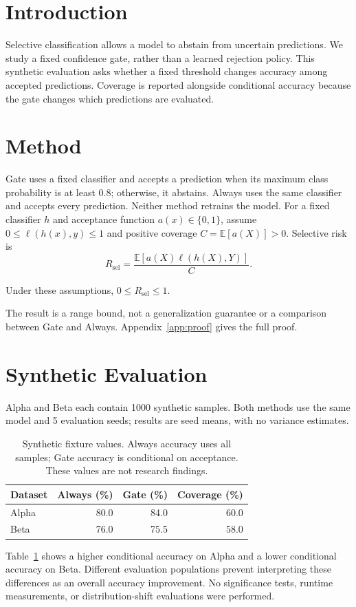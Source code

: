 \section{Introduction}
Selective classification allows a model to abstain from uncertain predictions.
We study a fixed confidence gate, rather than a learned rejection policy.
This synthetic evaluation asks whether a fixed threshold changes accuracy among
accepted predictions. Coverage is reported alongside conditional accuracy because
the gate changes which predictions are evaluated.
\section{Method}\label{sec:method}
Gate uses a fixed classifier and accepts a prediction when its maximum class
probability is at least 0.8; otherwise, it abstains. Always uses the same classifier
and accepts every prediction. Neither method retrains the model.
For a fixed classifier $h$ and acceptance function $a(x)\in\{0,1\}$, assume
$0\leq\ell(h(x),y)\leq1$ and positive coverage $C=\mathbb{E}[a(X)]>0$.
Selective risk is
\begin{equation}\label{eq:risk}
R_{\mathrm{sel}}=\frac{\mathbb{E}[a(X)\ell(h(X),Y)]}{C}.
\end{equation}
\begin{PWTheorem}\label{thm:bounded}
Under these assumptions, $0\leq R_{\mathrm{sel}}\leq1$.
\end{PWTheorem}
The result is a range bound, not a generalization guarantee or a comparison
between Gate and Always. Appendix~\ref{app:proof} gives the full proof.
\section{Synthetic Evaluation}\label{sec:results}
Alpha and Beta each contain 1000 synthetic samples. Both methods use the same
model and 5 evaluation seeds; results are seed means, with no variance estimates.
\begin{table}[htbp]\centering
\caption{Synthetic fixture values. Always accuracy uses all samples;
Gate accuracy is conditional on acceptance. These values are not research findings.}
\label{tab:results}
\begin{tabular}{lrrr}\hline
Dataset & Always (\%) & Gate (\%) & Coverage (\%)\\\hline
Alpha & 80.0 & 84.0 & 60.0\\
Beta & 76.0 & 75.5 & 58.0\\\hline
\end{tabular}\end{table}
Table~\ref{tab:results} shows a higher conditional accuracy on Alpha and a lower
conditional accuracy on Beta. Different evaluation populations prevent interpreting
these differences as an overall accuracy improvement. No significance tests,
runtime measurements, or distribution-shift evaluations were performed.
